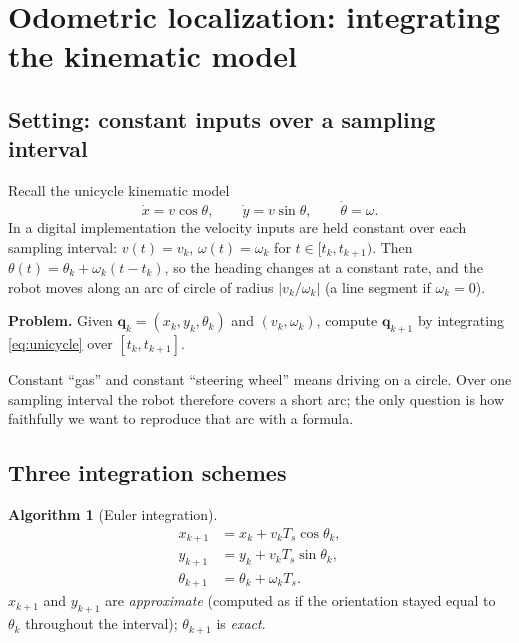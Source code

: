 \documentclass[11pt,a4paper]{article}
\newcommand{\Ts}{T_s}
\newcommand{\bq}{\boldsymbol{q}}
\newcommand{\slides}[1]{\texorpdfstring{\hspace{0.5em}{\normalfont\small\emph{(#1)}}}{}}
\theoremstyle{plain}
\theoremstyle{definition}
\newtheorem{algorithm}[theorem]{Algorithm}
\theoremstyle{remark}
\begin{document}
\section{Odometric localization: integrating the kinematic model \slides{odometry deck, slides 3--6}}

\subsection{Setting: constant inputs over a sampling interval}

Recall the unicycle kinematic model
\begin{equation}\label{eq:unicycle}
\dot x = v\cos\theta,\qquad \dot y = v\sin\theta,\qquad \dot\theta=\omega .
\end{equation}
In a digital implementation the velocity inputs are held constant over each sampling interval:
$v(t)=v_k$, $\omega(t)=\omega_k$ for $t\in[t_k,t_{k+1})$. Then $\theta(t)=\theta_k+\omega_k(t-t_k)$,
so the heading changes at a constant rate, and the robot moves along an arc of circle of radius
$|v_k/\omega_k|$ (a line segment if $\omega_k=0$).

\medskip
\noindent\textbf{Problem.} Given $\bq_k=(x_k,y_k,\theta_k)$ and $(v_k,\omega_k)$, compute $\bq_{k+1}$
by integrating \eqref{eq:unicycle} over $[t_k,t_{k+1}]$.

\begin{intuition}
Constant ``gas'' and constant ``steering wheel'' means driving on a circle. Over one sampling
interval the robot therefore covers a short arc; the only question is how faithfully we want to
reproduce that arc with a formula.
\end{intuition}

\subsection{Three integration schemes}

\begin{algorithm}[Euler integration]\label{alg:euler}
\begin{align}
x_{k+1}&=x_k+v_k\Ts\cos\theta_k,\nonumber\\
y_{k+1}&=y_k+v_k\Ts\sin\theta_k,\label{eq:euler}\\
\theta_{k+1}&=\theta_k+\omega_k\Ts .\nonumber
\end{align}
$x_{k+1}$ and $y_{k+1}$ are \emph{approximate} (computed as if the orientation stayed equal to
$\theta_k$ throughout the interval); $\theta_{k+1}$ is \emph{exact}.
\end{algorithm}
\end{document}
